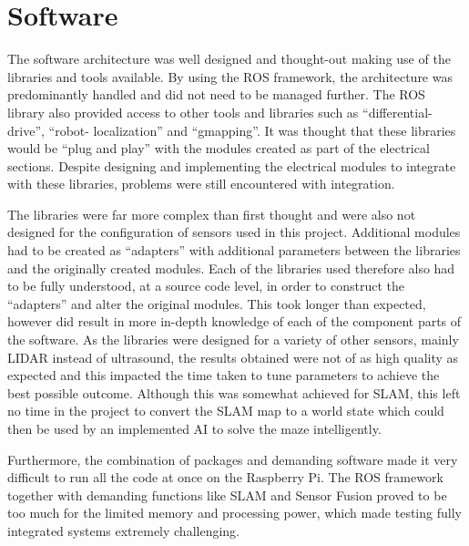 \section{Software}\label{eval/soft}
The software architecture was well designed and thought-out making use of the 
libraries and tools available. By using the ROS framework, the architecture was predominantly handled
and did not need to be managed further. The ROS library also provided 
access to other tools and libraries such as ``differential-drive'', ``robot-
localization'' and ``gmapping''. It was thought that these libraries would be ``plug 
and play'' with the modules created as part of the electrical sections. Despite  
designing and implementing the electrical modules to integrate with these libraries, 
problems were still encountered with integration. 

The libraries were far more complex than first thought and were also not designed for 
the configuration of sensors used in this project. Additional modules had to be 
created as ``adapters'' with additional parameters between the libraries and the 
originally created modules. Each of the libraries used therefore also had to be fully 
understood, at a source code level, in order to construct the ``adapters'' and alter 
the original modules. This took longer than expected, however did result in more in-depth knowledge of each of the component parts of the software. As the libraries were 
designed for a variety of other sensors, mainly LIDAR instead of ultrasound, the 
results obtained were not of as high quality as expected and this impacted the time 
taken to tune parameters to achieve the best possible outcome. Although this was 
somewhat achieved for SLAM, this left no time in the project to convert the SLAM map 
to a world state which could then be used by an implemented AI to solve the maze 
intelligently. 

Furthermore, the combination of packages and demanding software made it very difficult to run all the code at once on the Raspberry Pi. The ROS framework together with demanding functions like SLAM and Sensor Fusion proved to be too much for the limited memory and processing power, which made testing fully integrated systems extremely challenging.


